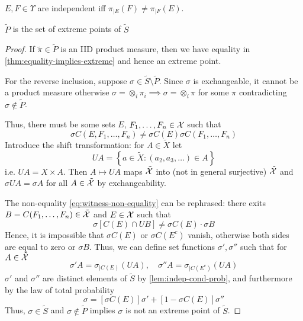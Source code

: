 \begin{lemma}
  \label{lem:indep-cond-prob}
  $E, F \in \Upsilon$ are independent iff $\pi_{\vert E}(F) \neq \pi_{\vert F}(E)$.
\end{lemma}

\begin{theorem}
  $\tilde{P}$ is the set of extreme points of $\tilde{S}$
\end{theorem}

\begin{proof}
  If $\tilde{\pi} \in \tilde{P}$ is an IID product measure, then
  we have equality in \cref{thm:equality-implies-extreme}
  and hence an extreme point.

  For the reverse inclusion, suppose $\sigma \in \tilde{S} \setminus \tilde{P}$.
  Since $\sigma$ is exchangeable, it cannot be a product measure otherwise
  $\sigma = \otimes_i \pi_i \implies \sigma = \otimes_i \pi$
  for some $\pi$ contradicting $\sigma \not\in \tilde{P}$.

  Thus, there must be some sets $E$, $F_1, \ldots, F_n \in \mathcal{X}$ such that
  \begin{equation}
    \label{eq:witness-non-equality}
    \sigma C(E, F_1, \ldots, F_n) \neq \sigma C(E) \sigma C(F_1, \ldots, F_n)
  \end{equation}
  Introduce the shift transformation: for $A \in \tilde{X}$ let
  \[
    UA = \left\{
      a \in \tilde{X} : (a_2, a_3, \ldots) \in A
    \right\}
  \]
  i.e. $U A = X \times A$. Then $A \mapsto U A$ maps $\tilde{\mathcal{X}}$ into
  (not in general surjective) $\tilde{\mathcal{X}}$ and
  $\sigma U A = \sigma A$ for all $A \in \tilde{\mathcal{X}}$
  by exchangeability.

  The non-equality \cref{eq:witness-non-equality} can be rephrased: there
  exits $B = C(F_1, \ldots, F_n) \in \tilde{\mathcal{X}}$ and $E \in \mathcal{X}$ such that
  \[
    \sigma[C(E) \cap U B] \neq \sigma C(E) \cdot \sigma B
  \]
  Hence, it is impossible that $\sigma C(E)$ or $\sigma C(E^c)$ vanish,
  otherwise both sides are equal to zero or $\sigma B$.
  Thus, we can define set functions $\sigma', \sigma''$ such
  that for $A \in \tilde{\mathcal{X}}$
  \[
    \sigma' A = \sigma_{\vert C(E)} (UA),
    \quad \sigma'' A = \sigma_{\vert C(E^c)}(UA)
  \]
  $\sigma'$ and $\sigma''$ are distinct elements of $\tilde{S}$
  by \cref{lem:indep-cond-prob}, and furthermore by the
  law of total probability
  \[
    \sigma = [\sigma C(E)] \sigma' + [1 - \sigma C(E)] \sigma''
  \]
  Thus, $\sigma \in \tilde{S}$ and $\sigma \not\in \tilde{P}$ implies
  $\sigma$ is not an extreme point of $\tilde{S}$.
\end{proof}

